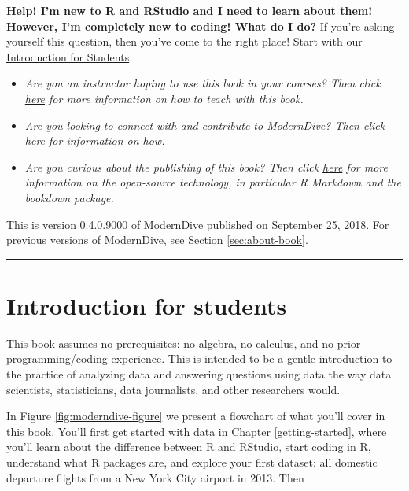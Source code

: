 \documentclass[12pt,]{krantz}
\providecommand{\tightlist}{%
  \setlength{\itemsep}{0pt}\setlength{\parskip}{0pt}}
\begin{document}
\textbf{Help! I'm new to R and RStudio and I need to learn about them!
However, I'm completely new to coding! What do I do?} If you're asking
yourself this question, then you've come to the right place! Start with
our \protect\hyperlink{sec:intro-for-students}{Introduction for
Students}.

\begin{itemize}
\tightlist
\item
  \emph{Are you an instructor hoping to use this book in your courses?
  Then click \protect\hyperlink{sec:intro-instructors}{here} for more
  information on how to teach with this book.}
\item
  \emph{Are you looking to connect with and contribute to ModernDive?
  Then click \protect\hyperlink{sec:connect-contribute}{here} for
  information on how.}
\item
  \emph{Are you curious about the publishing of this book? Then click
  \protect\hyperlink{sec:about-book}{here} for more information on the
  open-source technology, in particular R Markdown and the bookdown
  package.}
\end{itemize}

This is version 0.4.0.9000 of ModernDive published on September 25,
2018. For previous versions of ModernDive, see Section
\ref{sec:about-book}.

\begin{center}\rule{0.5\linewidth}{\linethickness}\end{center}

\hypertarget{sec:intro-for-students}{\section{Introduction for
students}\label{sec:intro-for-students}}

This book assumes no prerequisites: no algebra, no calculus, and no
prior programming/coding experience. This is intended to be a gentle
introduction to the practice of analyzing data and answering questions
using data the way data scientists, statisticians, data journalists, and
other researchers would.

In Figure \ref{fig:moderndive-figure} we present a flowchart of what
you'll cover in this book. You'll first get started with data in Chapter
\ref{getting-started}, where you'll learn about the difference between R
and RStudio, start coding in R, understand what R packages are, and
explore your first dataset: all domestic departure flights from a New
York City airport in 2013. Then
\end{document}
